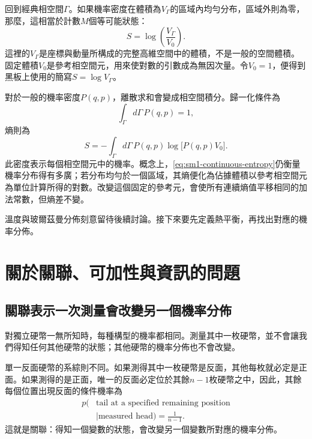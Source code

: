 回到經典相空間\(\Gamma\)。如果機率密度在體積為\(V_\Gamma\)的區域內均勻分布，區域外則為零，那麼，這相當於計數\(M\)個等可能狀態：
\begin{equation}
 S=\log\!\left(\frac{V_\Gamma}{V_0}\right).
 \label{eq:sm1-continuous-uniform}
\end{equation}
這裡的\(V_\Gamma\)是座標與動量所構成的完整高維空間中的體積，不是一般的空間體積。固定體積\(V_0\)是參考相空間元，用來使對數的引數成為無因次量。令\(V_0=1\)，便得到黑板上使用的簡寫\(S=\log V_\Gamma\)。

對於一般的機率密度\(P(q,p)\)，離散求和會變成相空間積分。歸一化條件為
\begin{equation}
 \int_\Gamma d\Gamma\,P(q,p)=1,
 \label{eq:sm1-continuous-normalization}
\end{equation}
熵則為
\begin{equation}
 S=-\int_\Gamma d\Gamma\,
 P(q,p)\log\!\bigl[P(q,p)V_0\bigr].
 \label{eq:sm1-continuous-entropy}
\end{equation}
此密度表示每個相空間元中的機率。概念上，\eqref{eq:sm1-continuous-entropy}仍衡量機率分布得有多廣；若分布均勻於一個區域，其熵便化為佔據體積以參考相空間元為單位計算所得的對數。改變這個固定的參考元，會使所有連續熵值平移相同的加法常數，但熵差不變。

\begin{classroomqa}
\end{classroomqa}

溫度與玻爾茲曼分佈刻意留待後續討論。接下來要先定義熱平衡，再找出對應的機率分佈。

\section{關於關聯、可加性與資訊的問題}

\subsection{關聯表示一次測量會改變另一個機率分佈}

對獨立硬幣一無所知時，每種構型的機率都相同。測量其中一枚硬幣，並不會讓我們得知任何其他硬幣的狀態；其他硬幣的機率分佈也不會改變。

單一反面硬幣的系綜則不同。如果測得其中一枚硬幣是反面，其他每枚就必定是正面。如果測得的是正面，唯一的反面必定位於其餘\(n-1\)枚硬幣之中，因此，其餘每個位置出現反面的條件機率為
\begin{equation}
\begin{aligned}
 p(&\text{tail at a specified remaining position}\\
   &\mid\text{measured head})=\frac{1}{n-1}.
\end{aligned}
 \label{eq:sm1-conditional-tail}
\end{equation}
這就是關聯：得知一個變數的狀態，會改變另一個變數所對應的機率分佈。


